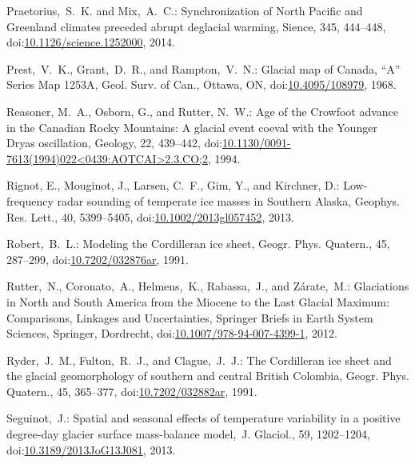 \documentclass[tc, manuscript]{copernicus}
\begin{document}
\begin{thebibliography}{114}
Praetorius,~S.~K. and Mix,~A.~C.: Synchronization of North Pacific and Greenland climates preceded abrupt deglacial warming, Sience, 345, 444--448,
doi:\href{http://dx.doi.org/10.1126/science.1252000}{10.1126/science.1252000}, 2014.


Prest,~V.~K., Grant,~D.~R., and Rampton,~V.~N.: Glacial map of Canada, ``A'' Series Map 1253A, Geol. Surv. of Can., Ottawa, ON,
doi:\href{http://dx.doi.org/10.4095/108979}{10.4095/108979}, 1968.


Reasoner, M.~A., Osborn, G., and Rutter, N.~W.: Age of the Crowfoot advance in the Canadian Rocky Mountains: A glacial event coeval with the Younger Dryas oscillation, Geology, 22, 439--442,
doi:\href{http://dx.doi.org/10.1130/0091-7613(1994)022<0439:AOTCAI>2.3.CO;2}{10.1130/0091-7613(1994)022<0439:AOTCAI>2.3.CO;2}, 1994.


Rignot, E., Mouginot, J., Larsen, C.~F., Gim, Y., and Kirchner, D.: Low-frequency radar sounding of temperate ice masses in Southern Alaska, Geophys. Res. Lett., 40, 5399--5405,
doi:\href{http://dx.doi.org/10.1002/2013gl057452}{10.1002/2013gl057452}, 2013.


Robert,~B.~L.: Modeling the Cordilleran ice sheet, G{e}ogr. Phys. Quatern., 45, 287--299,
doi:\href{http://dx.doi.org/10.7202/032876ar}{10.7202/032876ar}, 1991.


Rutter,~N., Coronato,~A., Helmens,~K., Rabassa,~J., and Z{\'a}rate,~M.: Glaciations in North and South America from the Miocene to the Last Glacial Maximum: Comparisons, Linkages and Uncertainties, Springer Briefs in Earth System Sciences, Springer, Dordrecht,
doi:\href{http://dx.doi.org/10.1007/978-94-007-4399-1}{10.1007/978-94-007-4399-1}, 2012.


Ryder,~J.~M., Fulton,~R.~J., and Clague,~J.~J.: The Cordilleran ice sheet and the glacial geomorphology of southern and central British Colombia, G{e}ogr. Phys. Quatern., 45, 365--377,
doi:\href{http://dx.doi.org/10.7202/032882ar}{10.7202/032882ar}, 1991.


Seguinot,~J.: Spatial and seasonal effects of temperature variability in a positive degree-day glacier surface mass-balance model,~J. Glaciol., 59, 1202--1204,
doi:\href{http://dx.doi.org/10.3189/2013JoG13J081}{10.3189/2013JoG13J081}, 2013.



\end{thebibliography}
\end{document}
